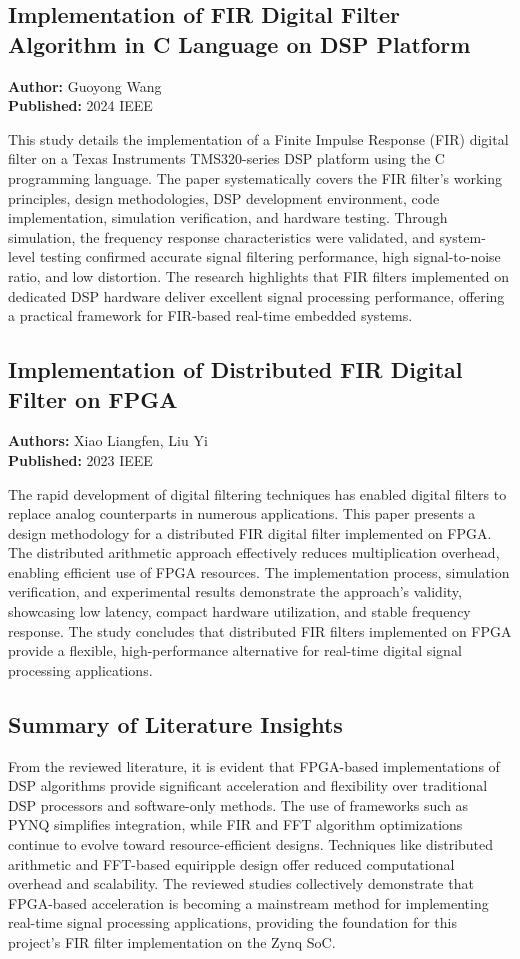 \documentclass[conference]{IEEEtran}
\begin{document}
	\subsection{Implementation of FIR Digital Filter Algorithm in C Language on DSP Platform}
	\textbf{Author:} Guoyong Wang \\
	\textbf{Published:} 2024 IEEE
	
	\noindent This study details the implementation of a Finite Impulse Response (FIR) digital filter on a Texas Instruments TMS320-series DSP platform using the C programming language. The paper systematically covers the FIR filter’s working principles, design methodologies, DSP development environment, code implementation, simulation verification, and hardware testing. Through simulation, the frequency response characteristics were validated, and system-level testing confirmed accurate signal filtering performance, high signal-to-noise ratio, and low distortion. The research highlights that FIR filters implemented on dedicated DSP hardware deliver excellent signal processing performance, offering a practical framework for FIR-based real-time embedded systems.
	
	\subsection{Implementation of Distributed FIR Digital Filter on FPGA}
	\textbf{Authors:} Xiao Liangfen, Liu Yi \\
	\textbf{Published:} 2023 IEEE
	
	\noindent The rapid development of digital filtering techniques has enabled digital filters to replace analog counterparts in numerous applications. This paper presents a design methodology for a distributed FIR digital filter implemented on FPGA. The distributed arithmetic approach effectively reduces multiplication overhead, enabling efficient use of FPGA resources. The implementation process, simulation verification, and experimental results demonstrate the approach’s validity, showcasing low latency, compact hardware utilization, and stable frequency response. The study concludes that distributed FIR filters implemented on FPGA provide a flexible, high-performance alternative for real-time digital signal processing applications.
	
	\subsection{Summary of Literature Insights}
	From the reviewed literature, it is evident that FPGA-based implementations of DSP algorithms provide significant acceleration and flexibility over traditional DSP processors and software-only methods. The use of frameworks such as PYNQ simplifies integration, while FIR and FFT algorithm optimizations continue to evolve toward resource-efficient designs. Techniques like distributed arithmetic and FFT-based equiripple design offer reduced computational overhead and scalability. The reviewed studies collectively demonstrate that FPGA-based acceleration is becoming a mainstream method for implementing real-time signal processing applications, providing the foundation for this project’s FIR filter implementation on the Zynq SoC.
	
\end{document}
